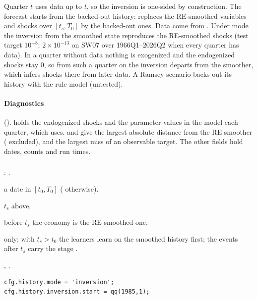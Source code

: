 \documentclass[11pt,a4paper]{article}
\DeclareRobustCommand{\codem}[1]{\texttt{\detokenize{#1}}}
\newenvironment{optspec}%
  {\begin{description}[style=sameline,leftmargin=2.7cm,labelwidth=2.5cm,font=\normalfont\itshape]}%
  {\end{description}}
\begin{document}
Quarter $t$ uses data up to $t$, so the inversion is one-sided by construction. The forecast starts
from the backed-out history:  replaces the RE-smoothed variables and shocks
over $[t_s, T_0]$ by the backed-out ones. Data come from . Under mode
 the inversion from the smoothed state reproduces the RE-smoothed shocks (test
target $10^{-8}$; $2\times10^{-13}$ on SW07 over 1966Q1--2026Q2 when every quarter has data). In a
quarter without data nothing is exogenized and the endogenized shocks
stay 0, so from such a quarter on the inversion departs from the smoother, which infers shocks
there from later data. A Ramsey scenario backs out its history with the rule model (untested).

\paragraph{Diagnostics} ().  holds the endogenized shocks and
 the parameter values in the model each quarter, which 
uses.  and  give the largest absolute
distance from the RE smoother ( excluded), and  the largest
miss of an observable target. The other fields hold dates, counts and run times.

\subsubsection{\texorpdfstring{\codem{history.inversion.start}}{history.inversion.start}}\label{opt:history-inversion-start}
\begin{optspec}
  \item[Default] \code{[]}: .
  \item[Values] a date in $[t_0, T_0]$ ( otherwise).
  \item[Math] $t_s$ above.
  \item[Assumptions] before $t_s$ the economy is the RE-smoothed one.
  \item[Interactions]  only; with $t_s > t_0$ the learners learn on the
        smoothed history first; the events after $t_s$ carry the stage .
  \item[Code] , .
  \item[Example]
\begin{lstlisting}
cfg.history.mode = 'inversion';
cfg.history.inversion.start = qq(1985,1);
\end{lstlisting}
\end{optspec}
\end{document}

